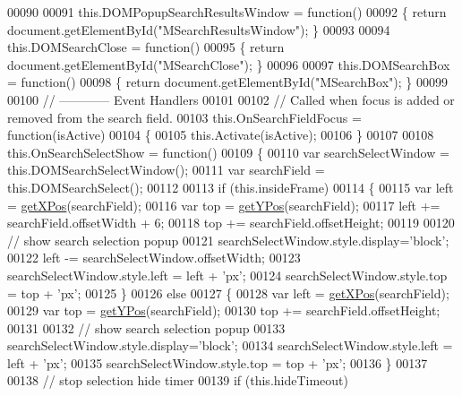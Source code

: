 \begin{DoxyCode}
00090 
00091   this.DOMPopupSearchResultsWindow = \textcolor{keyword}{function}()
00092   \{  \textcolor{keywordflow}{return} document.getElementById(\textcolor{stringliteral}{"MSearchResultsWindow"});  \}
00093 
00094   this.DOMSearchClose = \textcolor{keyword}{function}()
00095   \{  \textcolor{keywordflow}{return} document.getElementById(\textcolor{stringliteral}{"MSearchClose"}); \}
00096 
00097   this.DOMSearchBox = \textcolor{keyword}{function}()
00098   \{  \textcolor{keywordflow}{return} document.getElementById(\textcolor{stringliteral}{"MSearchBox"});  \}
00099 
00100   \textcolor{comment}{// ------------ Event Handlers}
00101 
00102   \textcolor{comment}{// Called when focus is added or removed from the search field.}
00103   this.OnSearchFieldFocus = \textcolor{keyword}{function}(isActive)
00104   \{
00105     this.Activate(isActive);
00106   \}
00107 
00108   this.OnSearchSelectShow = \textcolor{keyword}{function}()
00109   \{
00110     var searchSelectWindow = this.DOMSearchSelectWindow();
00111     var searchField        = this.DOMSearchSelect();
00112 
00113     \textcolor{keywordflow}{if} (this.insideFrame)
00114     \{
00115       var left = \hyperlink{search_8js_a76d24aea0009f892f8ccc31d941c0a2b}{getXPos}(searchField);
00116       var top  = \hyperlink{search_8js_a8d7b405228661d7b6216b6925d2b8a69}{getYPos}(searchField);
00117       left += searchField.offsetWidth + 6;
00118       top += searchField.offsetHeight;
00119 
00120       \textcolor{comment}{// show search selection popup}
00121       searchSelectWindow.style.display=\textcolor{stringliteral}{'block'};
00122       left -= searchSelectWindow.offsetWidth;
00123       searchSelectWindow.style.left =  left + \textcolor{stringliteral}{'px'};
00124       searchSelectWindow.style.top  =  top  + \textcolor{stringliteral}{'px'};
00125     \}
00126     \textcolor{keywordflow}{else}
00127     \{
00128       var left = \hyperlink{search_8js_a76d24aea0009f892f8ccc31d941c0a2b}{getXPos}(searchField);
00129       var top  = \hyperlink{search_8js_a8d7b405228661d7b6216b6925d2b8a69}{getYPos}(searchField);
00130       top += searchField.offsetHeight;
00131 
00132       \textcolor{comment}{// show search selection popup}
00133       searchSelectWindow.style.display=\textcolor{stringliteral}{'block'};
00134       searchSelectWindow.style.left =  left + \textcolor{stringliteral}{'px'};
00135       searchSelectWindow.style.top  =  top  + \textcolor{stringliteral}{'px'};
00136     \}
00137 
00138     \textcolor{comment}{// stop selection hide timer}
00139     \textcolor{keywordflow}{if} (this.hideTimeout)

\end{DoxyCode}
